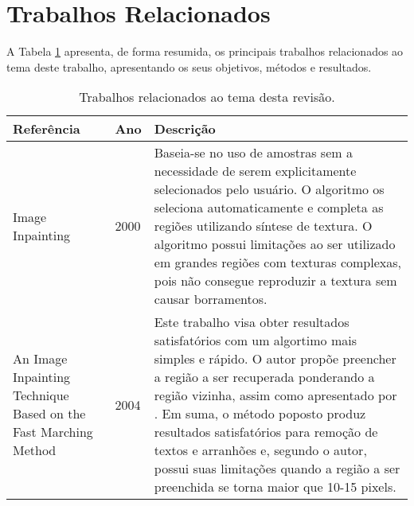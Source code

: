 \section{Trabalhos Relacionados} \label{related}

A Tabela \ref{related-works} apresenta, de forma resumida, os principais trabalhos relacionados ao tema deste trabalho, apresentando os seus objetivos, métodos e resultados.

\begin{table}[h]
\centering
\caption{Trabalhos relacionados ao tema desta revisão.}
\vspace{0.5cm}
\label{related-works}
\begin{tabularx}{\linewidth}{|p{4cm}|l|X|}
\hline
\textbf{Referência} & \textbf{Ano} & \textbf{Descrição} \\
\hline
Image Inpainting \cite{Bertalmio2000} & 2000 & Baseia-se no uso de amostras sem a necessidade de serem explicitamente selecionados pelo usuário. O algoritmo os seleciona automaticamente e completa as regiões utilizando síntese de textura. O algoritmo possui limitações ao ser utilizado em grandes regiões com texturas complexas, pois não consegue reproduzir a textura sem causar borramentos. \\

\hline

An Image Inpainting Technique Based on the Fast Marching Method \cite{Telea2004} & 2004 & Este trabalho visa obter resultados satisfatórios com um algortimo mais simples e rápido. O autor propõe preencher a região a ser recuperada ponderando a região vizinha, assim como apresentado por \cite{Bertalmio2000}. Em suma, o método poposto produz resultados satisfatórios para remoção de textos e arranhões e, segundo o autor, possui suas limitações quando a região a ser preenchida se torna maior que 10-15 pixels. \\

\hline



\hline

\end{tabularx}
\end{table}







